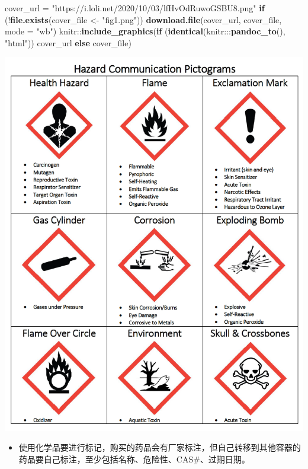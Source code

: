 \documentclass[]{tufte-book}
\newenvironment{Shaded}{}{}
\newcommand{\ControlFlowTok}[1]{\textcolor[rgb]{0.00,0.44,0.13}{\textbf{#1}}}
\newcommand{\DataTypeTok}[1]{\textcolor[rgb]{0.56,0.13,0.00}{#1}}
\newcommand{\KeywordTok}[1]{\textcolor[rgb]{0.00,0.44,0.13}{\textbf{#1}}}
\newcommand{\NormalTok}[1]{#1}
\newcommand{\OperatorTok}[1]{\textcolor[rgb]{0.40,0.40,0.40}{#1}}
\newcommand{\StringTok}[1]{\textcolor[rgb]{0.25,0.44,0.63}{#1}}
\providecommand{\tightlist}{%
  \setlength{\itemsep}{0pt}\setlength{\parskip}{0pt}}
\begin{document}
\begin{Shaded}
\begin{Highlighting}[]
\NormalTok{cover_url =}\StringTok{ "https://i.loli.net/2020/10/03/lfHvOdRuwoGSBU8.png"}
\ControlFlowTok{if}\NormalTok{ (}\OperatorTok{!}\KeywordTok{file.exists}\NormalTok{(cover_file <-}\StringTok{ "fig1.png"}\NormalTok{)) }\KeywordTok{download.file}\NormalTok{(cover_url, }
\NormalTok{    cover_file, }\DataTypeTok{mode =} \StringTok{"wb"}\NormalTok{)}
\NormalTok{knitr}\OperatorTok{::}\KeywordTok{include_graphics}\NormalTok{(}\ControlFlowTok{if}\NormalTok{ (}\KeywordTok{identical}\NormalTok{(knitr}\OperatorTok{:::}\KeywordTok{pandoc_to}\NormalTok{(), }\StringTok{"html"}\NormalTok{)) cover_url }\ControlFlowTok{else}\NormalTok{ cover_file)}
\end{Highlighting}
\end{Shaded}

\includegraphics[width=11.94in]{fig1}

\begin{itemize}
\tightlist
\item
  使用化学品要进行标记，购买的药品会有厂家标注，但自己转移到其他容器的药品要自己标注，至少包括名称、危险性、CAS\#、过期日期。
\end{itemize}
\end{document}
